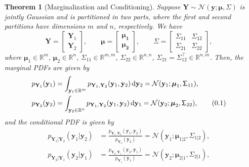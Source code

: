 \documentclass[10pt]{article}
\newtheorem{thm}{Theorem}[section]
\theoremstyle{definition}
\newcommand\eqnum{\addtocounter{equation}{1}\tag{\arabic{section}.\arabic{equation}}}
\DeclareMathOperator{\df}{d\!}
\begin{document}
\begin{thm}[Marginalization and Conditioning]\label{thm:MVN:MC}
Suppose $\mathbf{Y}\sim\mathcal{N}(\mathcal{\mathbf{y}; \boldsymbol{\mu}, \mathsf{\Sigma}})$ is jointly Gaussian and is partitioned in two parts, where the first and second partitions have dimensions $m$ and $n$, respectively. We have
\begin{equation}
\mathbf{Y} =
\begin{bmatrix}
\mathbf{Y}_1 \\
\mathbf{Y}_2
\end{bmatrix}, \qquad
\boldsymbol{\mu} = 
\begin{bmatrix}
\boldsymbol{\mu_1} \\
\boldsymbol{\mu_2}
\end{bmatrix}, \qquad
\mathsf{\Sigma} = 
\begin{bmatrix}
\mathsf{\Sigma_{11}} & \mathsf{\Sigma_{12}} \\
\mathsf{\Sigma_{21}} & \mathsf{\Sigma_{22}}
\end{bmatrix},
\end{equation}
where $\boldsymbol{\mu}_1\in\mathbb{R}^m$, $\boldsymbol{\mu}_2\in\mathbb{R}^n$, $\mathsf{\Sigma}_{11}\in\mathbb{R}^{m,m}$, $\mathsf{\Sigma}_{22}\in\mathbb{R}^{n,n}$, $\mathsf{\Sigma}_{21} = \mathsf{\Sigma}_{12}^{\top}\in\mathbb{R}^{n,m}$. Then, the marginal PDFs are given by
\begin{align*}
p_{\mathbf{Y}_1}(\mathbf{y}_1) &= \int_{\mathbf{y}_1\in\mathbb{R}^m}p_{\mathbf{Y}_1,\mathbf{Y}_2}(\mathbf{y}_1, \mathbf{y}_2)\df \mathbf{y}_2 = \mathcal{N}(\mathbf{y}_1; \boldsymbol{\mu}_1, \mathsf{\Sigma}_{11}), \\
p_{\mathbf{Y}_2}(\mathbf{y}_2) &= \int_{\mathbf{y}_2\in\mathbb{R}^n}p_{\mathbf{Y}_1,\mathbf{Y}_2}(\mathbf{y}_1, \mathbf{y}_2)\df \mathbf{y}_1 = \mathcal{N}(\mathbf{y}_2; \boldsymbol{\mu}_2, \mathsf{\Sigma}_{22}),
\eqnum
\label{eq:MVN:marg}
\end{align*}
and the conditional PDF is given by
\begin{align*}
p_{\mathbf{Y}_1|\mathbf{Y}_2}(\mathbf{y}_1|\mathbf{y}_2) &= 
\frac{p_{\mathbf{Y}_1,\mathbf{Y}_2}(\mathbf{y}_1,\mathbf{y}_2)}{p_{\mathbf{Y}_2}(\mathbf{y}_2)} = \mathcal{N}(\mathbf{y}_1;\boldsymbol{\mu}_{1|2},\mathsf{\Sigma}_{1|2}), \\
p_{\mathbf{Y}_2|\mathbf{Y}_1}(\mathbf{y}_2|\mathbf{y}_1) &= 
\frac{p_{\mathbf{Y}_2,\mathbf{Y}_1}(\mathbf{y}_2,\mathbf{y}_1)}{p_{\mathbf{Y}_1}(\mathbf{y}_1)} = \mathcal{N}(\mathbf{y}_2;\boldsymbol{\mu}_{2|1},\mathsf{\Sigma}_{2|1}),

\end{align*}
\end{thm}
\end{document}
